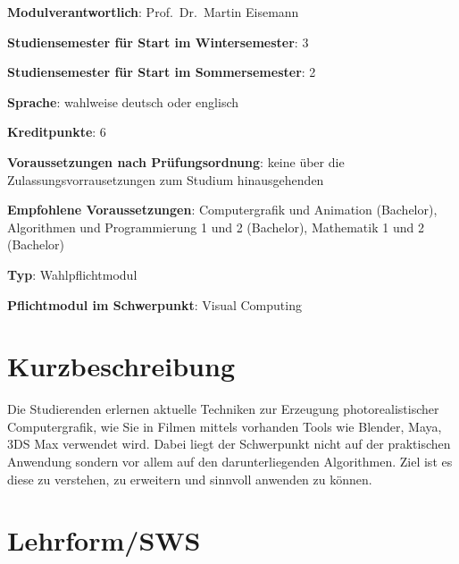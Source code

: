 \begin{modulHead}
\textbf{Modulverantwortlich}: Prof.~Dr.~Martin
Eisemann
\end{modulHead}
\begin{modulHead}
\textbf{Studiensemester für
Start im Wintersemester}:
3
\end{modulHead}
\begin{modulHead}
\textbf{Studiensemester für Start
im Sommersemester}:
2
\end{modulHead}
\begin{modulHead}
\textbf{Sprache}: wahlweise deutsch
oder englisch
\end{modulHead}
\begin{modulHead}
\textbf{Kreditpunkte}:
6
\end{modulHead}
\begin{modulHead}
\textbf{Voraussetzungen nach
Prüfungsordnung}: keine über die Zulassungsvorrausetzungen zum Studium
hinausgehenden
\end{modulHead}
\begin{modulHead}
\textbf{Empfohlene
Voraussetzungen}: Computergrafik und Animation (Bachelor), Algorithmen
und Programmierung 1 und 2 (Bachelor), Mathematik 1 und 2
(Bachelor)
\end{modulHead}
\begin{modulHead}
\textbf{Typ}:
Wahlpflichtmodul
\end{modulHead}
\begin{modulHead}
\textbf{Pflichtmodul
im Schwerpunkt}: Visual Computing
\end{modulHead}


\section*{Kurzbeschreibung\label{/mi-2017/modulbeschreibungen-master/MA_VC_Modul_PhotorealistischeBildsynthese}}\label{kurzbeschreibungpathlabelmi-2017modulbeschreibungen-mastermaux5fvcux5fmodulux5fphotorealistischebildsynthese}

Die Studierenden erlernen aktuelle Techniken zur Erzeugung
photorealistischer Computergrafik, wie Sie in Filmen mittels vorhanden
Tools wie Blender, Maya, 3DS Max verwendet wird. Dabei liegt der
Schwerpunkt nicht auf der praktischen Anwendung sondern vor allem auf
den darunterliegenden Algorithmen. Ziel ist es diese zu verstehen, zu
erweitern und sinnvoll anwenden zu können.

\section*{Lehrform/SWS\label{/mi-2017/modulbeschreibungen-master/MA_VC_Modul_PhotorealistischeBildsynthese}}\label{lehrformswspathlabelmi-2017modulbeschreibungen-mastermaux5fvcux5fmodulux5fphotorealistischebildsynthese}


